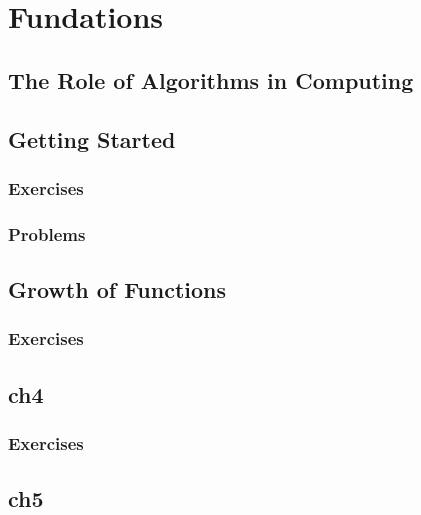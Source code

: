 \documentclass[a4paper, 11pt, fleqn]{report}
\begin{document}
    \tableofcontents
    \part{Fundations}
        \chapter{The Role of Algorithms in Computing}

        \chapter{Getting Started}
            \section*{Exercises}
                
                
                
            \section*{Problems}
                
                
                
                
        \chapter{Growth of Functions}
            \section*{Exercises}
                
                
                
                
        \chapter{ch4}
            \section*{Exercises}
        \chapter{ch5}
\end{document}
